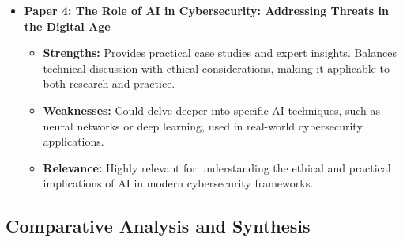 \documentclass[12pt]{article}
\begin{document}
\begin{itemize}
    \item \textbf{Paper 4: The Role of AI in Cybersecurity: Addressing Threats in the Digital Age}
    \begin{itemize}
        \item \textbf{Strengths:} Provides practical case studies and expert insights. Balances technical discussion with ethical considerations, making it applicable to both research and practice.
        \item \textbf{Weaknesses:} Could delve deeper into specific AI techniques, such as neural networks or deep learning, used in real-world cybersecurity applications.
        \item \textbf{Relevance:} Highly relevant for understanding the ethical and practical implications of AI in modern cybersecurity frameworks.
    \end{itemize}
\end{itemize}

\subsection{Comparative Analysis and Synthesis}
\end{document}
